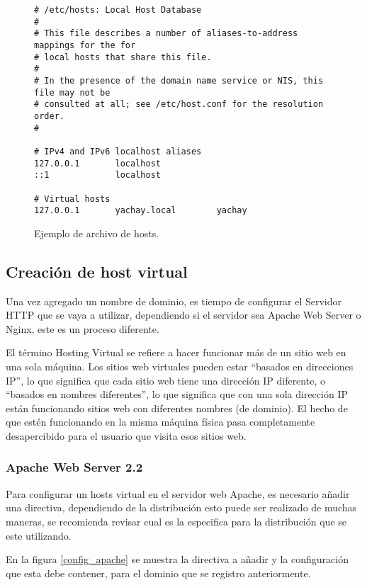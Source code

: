 \begin{figure}
\begin{verbatim}
# /etc/hosts: Local Host Database
#
# This file describes a number of aliases-to-address mappings for the for 
# local hosts that share this file.
#
# In the presence of the domain name service or NIS, this file may not be 
# consulted at all; see /etc/host.conf for the resolution order.
#

# IPv4 and IPv6 localhost aliases
127.0.0.1       localhost
::1             localhost

# Virtual hosts
127.0.0.1       yachay.local        yachay
\end{verbatim}
\caption{Ejemplo de archivo de hosts.}
\label{config_hosts}
\end{figure}

\subsection{Creación de host virtual}
Una vez agregado un nombre de dominio, es tiempo de configurar el Servidor HTTP
que se vaya a utilizar, dependiendo si el servidor sea Apache Web Server o
Nginx, este es un proceso diferente.

El término Hosting Virtual se refiere a hacer funcionar más de un sitio web en
una sola máquina. Los sitios web virtuales pueden estar ``basados en direcciones
IP'', lo que significa que cada sitio web tiene una dirección IP diferente, o
``basados en nombres diferentes'', lo que significa que con una sola dirección
IP están funcionando sitios web con diferentes nombres (de dominio). El hecho de
que estén funcionando en la misma máquina física pasa completamente
desapercibido para el usuario que visita esos sitios web\cite{Apache}.

\subsubsection{Apache Web Server 2.2}
Para configurar un hosts virtual en el servidor web Apache, es necesario añadir
una directiva, dependiendo de la distribución esto puede ser realizado de muchas
maneras, se recomienda revisar cual es la especifica para la distribución que se
este utilizando.

En la figura \ref{config_apache} se muestra la directiva a añadir y la
configuración que esta debe contener, para el dominio que se registro
anteriormente.

